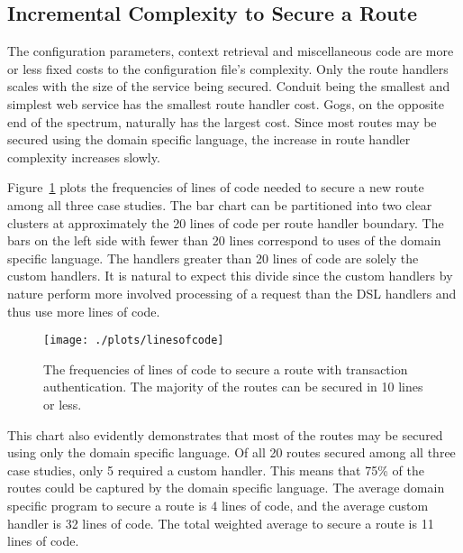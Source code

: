 \subsection{Incremental Complexity to Secure a Route}

The configuration parameters, context retrieval and miscellaneous code are more or less fixed costs to the configuration file's complexity. Only the route handlers scales with the size of the service being secured. Conduit being the smallest and simplest web service has the smallest route handler cost. Gogs, on the opposite end of the spectrum, naturally has the largest cost. Since most routes may be secured using the domain specific language, the increase in route handler complexity increases slowly.

Figure~\ref{Fig:IncrementalComplexity} plots the frequencies of lines of code needed to secure a new route among all three case studies. The bar chart can be partitioned into two clear clusters at approximately the 20 lines of code per route handler boundary. The bars on the left side with fewer than 20 lines correspond to uses of the domain specific language. The handlers greater than 20 lines of code are solely the custom handlers. It is natural to expect this divide since the custom handlers by nature perform more involved processing of a request than the DSL handlers and thus use more lines of code.


\begin{figure}
  \centering
  \texttt{[image: ./plots/linesofcode]}
  \caption{The frequencies of lines of code to secure a route with transaction authentication. The majority of the routes can be secured in 10 lines or less.}
  \label{Fig:IncrementalComplexity}
\end{figure}

This chart also evidently demonstrates that most of the routes may be secured using only the domain specific language. Of all 20 routes secured among all three case studies, only 5 required a custom handler. This means that 75\% of the routes could be captured by the domain specific language. The average domain specific program to secure a route is 4 lines of code, and the average custom handler is 32 lines of code. The total weighted average to secure a route is 11 lines of code.

